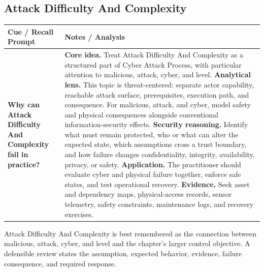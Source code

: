 \documentclass[11pt]{article}
\newcommand{\CornellHeader}{%
\rowcolor{Navy}\color{white}\bfseries Cue / Recall Prompt & \color{white}\bfseries Notes / Analysis\\\hline}
\newcommand{\CornellRow}[2]{%
\cellcolor{CueGray}\RaggedRight\textbf{#1} & \RaggedRight #2\\\hline}
\begin{document}
\subsection*{Attack Difficulty And Complexity}
\begin{longtable}{>{\RaggedRight\arraybackslash}p{}|>{\RaggedRight\arraybackslash}p{}}
\CornellHeader
\CornellRow{Why can Attack Difficulty And Complexity fail in practice?}{\textbf{Core idea.} Treat Attack Difficulty And Complexity as a structured part of Cyber Attack Process, with particular attention to malicious, attack, cyber, and level. \textbf{Analytical lens.} This topic is threat-centered: separate actor capability, reachable attack surface, prerequisites, execution path, and consequence. For malicious, attack, and cyber, model safety and physical consequences alongside conventional information-security effects. \textbf{Security reasoning.} Identify what must remain protected, who or what can alter the expected state, which assumptions cross a trust boundary, and how failure changes confidentiality, integrity, availability, privacy, or safety. \textbf{Application.} The practitioner should evaluate cyber and physical failure together, enforce safe states, and test operational recovery. \textbf{Evidence.} Seek asset and dependency maps, physical-access records, sensor telemetry, safety constraints, maintenance logs, and recovery exercises.}
\end{longtable}
\begin{topicsummary}
Attack Difficulty And Complexity is best remembered as the connection between malicious, attack, cyber, and level and the chapter's larger control objective. A defensible review states the assumption, expected behavior, evidence, failure consequence, and required response.
\end{topicsummary}
\end{document}
